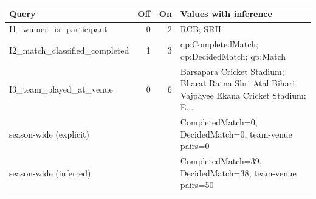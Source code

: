 {\footnotesize
\begin{tabular}{lrrp{8.2cm}}
\toprule
\textbf{Query} & \textbf{Off} & \textbf{On} & \textbf{Values with inference} \\
\midrule
I1\_winner\_is\_participant & 0 & 2 & RCB; SRH \\
I2\_match\_classified\_completed & 1 & 3 & qp:CompletedMatch; qp:DecidedMatch; qp:Match \\
I3\_team\_played\_at\_venue & 0 & 6 & Barsapara Cricket Stadium; Bharat Ratna Shri Atal Bihari Vajpayee Ekana Cricket Stadium; E... \\
season-wide (explicit) &  &  & CompletedMatch=0, DecidedMatch=0, team-venue pairs=0 \\
season-wide (inferred) &  &  & CompletedMatch=39, DecidedMatch=38, team-venue pairs=50 \\
\bottomrule
\end{tabular}}
